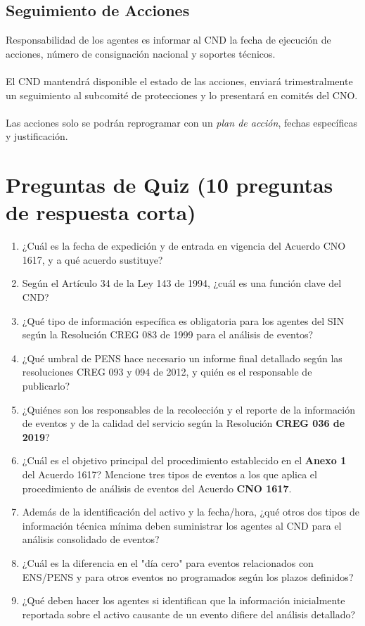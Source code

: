 \documentclass[a5paper]{book}%
\begin{document}
\subsection{Seguimiento de Acciones}

    Responsabilidad de los agentes es informar al CND la fecha de ejecución de acciones, número de consignación nacional y soportes técnicos.\\\\
    El CND mantendrá disponible el estado de las acciones, enviará trimestralmente un seguimiento al subcomité de protecciones y lo presentará en comités del CNO.\\\\
    Las acciones solo se podrán reprogramar con un \textit{plan de acción}, fechas específicas y justificación.

\section{Preguntas de Quiz (10 preguntas de respuesta corta)}

\begin{enumerate}
\item ¿Cuál es la fecha de expedición y de entrada en vigencia del Acuerdo CNO 1617, y a qué acuerdo sustituye?
\item Según el Artículo 34 de la Ley 143 de 1994, ¿cuál es una función clave del CND?
\item ¿Qué tipo de información específica es obligatoria para los agentes del \ac{SIN} según la Resolución CREG 083 de 1999 para el análisis de eventos?
\item ¿Qué umbral de \ac{PENS} hace necesario un informe final detallado según las resoluciones CREG 093 y 094 de 2012, y quién es el responsable de publicarlo?
\item ¿Quiénes son los responsables de la recolección y el reporte de la información de eventos y de la calidad del servicio según la Resolución \textbf{CREG 036 de 2019}?
\item ¿Cuál es el objetivo principal del procedimiento establecido en el \textbf{Anexo 1} del Acuerdo 1617?
    Mencione tres tipos de eventos a los que aplica el procedimiento de análisis de eventos del Acuerdo \textbf{CNO 1617}.
  \item Además de la identificación del activo y la fecha/hora, ¿qué otros dos tipos de información técnica mínima deben suministrar los agentes al \ac{CND} para el análisis consolidado de eventos?
  \item ¿Cuál es la diferencia en el "día cero" para eventos relacionados con \ac{ENS}/\ac{PENS} y para otros eventos no programados según los plazos definidos?
  \item ¿Qué deben hacer los agentes si identifican que la información inicialmente reportada sobre el activo causante de un evento difiere del análisis detallado?
  \end{enumerate}
  
\end{document}
